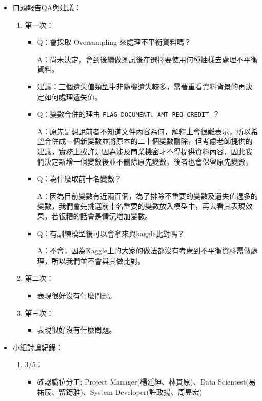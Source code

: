 \documentclass[12pt, a4paper]{article}
\begin{document}
\begin{itemize}
\item 口頭報告QA與建議：
\begin{enumerate}
\item 第一次：
\begin{itemize}
\item Q：會採取 Oversampling 來處理不平衡資料嗎？

A：尚未決定，會到後續做測試後在選擇要使用何種抽樣去處理不平衡資料。
\item 建議：三個遺失值類型中非隨機遺失較多，需著重看資料背景的再決定如何處理遺失值。

\item Q：變數合併的理由 \verb|FLAG_DOCUMENT|、\verb|AMT_REQ_CREDIT_|？

A：原先是想說前者不知道文件內容為何，解釋上會很難表示，所以希望合併成一個新變數並將原本的二十個變數刪除，但考慮老師提供的建議，實務上或許是因為涉及商業機密才不得提供資料內容，因此我們決定新增一個變數後並不刪除原先變數。後者也會保留原先變數。

\item Q：為什麼取前十名變數？

A：因為目前變數有近兩百個，為了排除不重要的變數及遺失值過多的變數，我們會先挑選前十名重要的變數放入模型中，再去看其表現效果，若很糟的話會是情況增加變數。
\item Q：有訓練模型後可以會拿來與kaggle比對嗎？

A：不會，因為Kaggle上的大家的做法都沒有考慮到不平衡資料需做處理，所以我們並不會與其做比對。
\end{itemize}

\item 第二次：
\begin{itemize}
\item 表現很好沒有什麼問題。
\end{itemize}

\item 第三次：
\begin{itemize}
\item 表現很好沒有什麼問題。
\end{itemize}
\end{enumerate}

\item 小組討論紀錄：
\begin{enumerate}
\item 3/5：
\begin{itemize}
\item 確認職位分工: Project Manager(楊廷紳、林貫原)、Data Scientest(易祐辰、留筠雅)、System Developer(許政揚、周昱宏)


\end{itemize}
\end{enumerate}
\end{itemize}
\end{document}
